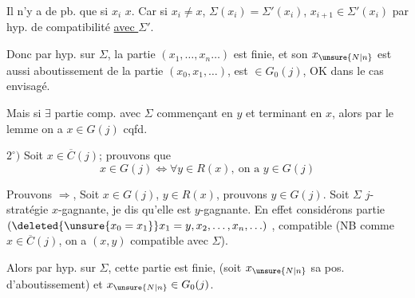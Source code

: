 Il n'y a de pb. que si  $x_i$ \unsure{$\in$} $x$. Car si $x_i\ne x$, $\Sigma(x_i)=\Sigma'(x_i)$,  $x_{i+1}\in\Sigma'(x_i)$ par hyp. de compatibilité \uline{avec $\Sigma'$}.


Donc par hyp. sur $\Sigma$, la partie $(x_1,\ldots,x_n\ldots)$ est finie,  et son  $x_{\unsure{N|n}}$  est aussi aboutissement de la partie $(x_0,x_1,\ldots)$, est $\in G_0(j)$,  OK dans le cas envisagé.

Mais si $\exists$ partie comp. avec $\Sigma$ commençant en $y$ et terminant en $x$, alors par le lemme on a  $x\in G(j)$ cqfd.

$2^\circ)$ Soit $x\in\overline C(j)$; prouvons que
\[
x\in G(j)\Longleftrightarrow\forall y\in R(x),\ \text{on a }y\in G(j)
\]


Prouvons $\Longrightarrow$, Soit $x\in G(j)$, $y\in R(x)$, prouvons $y\in G(j)$. Soit $\Sigma$ $j$-stratégie  $x$-gagnante, je dis qu'elle est $y$-gagnante. En effet considérons  partie $(\deleted{\unsure{x_0=x_1}}x_1=y,x_2,\ldots,x_n,\ldots)$ , compatible  (NB comme $x\in\overline C(j)$, on a $(x,y)$ compatible avec $\Sigma$).

Alors par hyp. sur $\Sigma$, cette partie est finie, (soit $x_{\unsure{N|n}}$ sa pos. d'aboutissement) et $x_{\unsure{N|n}}\in G_0(j)$. 

